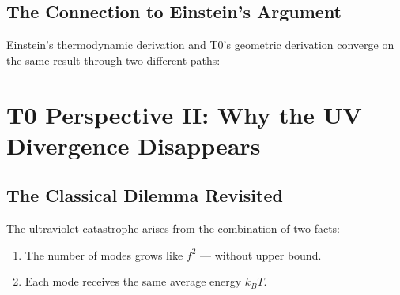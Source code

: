 \subsection{The Connection to Einstein's Argument}

Einstein's thermodynamic derivation and T0's geometric derivation converge on the 
same result through two different paths:

\begin{table}[h]
    \centering
    \caption{Two paths to the equation $\epsilon = hf$}
    \label{tab:two_ways}
\end{table}

\clearpage

\section{T0 Perspective II: Why the UV Divergence Disappears}
\label{sec:t0_uv}

\subsection{The Classical Dilemma Revisited}

The ultraviolet catastrophe arises from the combination of two facts:
\begin{enumerate}
    \item The number of modes grows like $f^2$ — without upper bound.
    \item Each mode receives the same average energy $k_BT$.
\end{enumerate}

